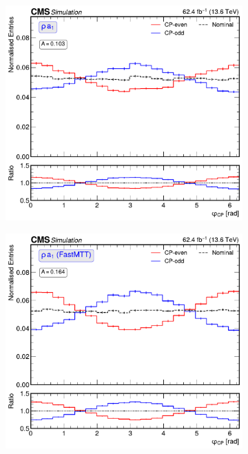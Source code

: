 \begin{figure}[!htbp]
\begin{subfigure}[b]{0.49\textwidth}
            \caption{}
        \end{subfigure}
        \begin{subfigure}[b]{0.49\textwidth}
            \centering
            \includegraphics[width=\textwidth]{Figures/Chapter7/Acoplanarity/With_IP/aco_rho_a1.pdf}
            \caption{}
        \end{subfigure}
        \begin{subfigure}[b]{0.49\textwidth}
            \centering
            \includegraphics[width=\textwidth]{Figures/Chapter7/Acoplanarity/With_IP/aco_rho_a1_FASTMTT_MassConstraint.pdf}

\end{subfigure}
\end{figure}
